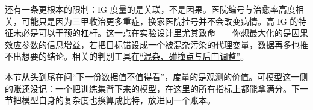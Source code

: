 还有一条更根本的限制：IG 度量的是关联，不是因果。医院编号与治愈率高度相关，可能只是因为三甲收治更多重症，换家医院挂号并不会改变病情。高 IG 的特征未必是可以干预的杠杆。这一点在实验设计里尤其致命——你想最大化的是因果效应参数的信息增益，若把目标错设成一个被混杂污染的代理变量，数据再多也推不出想要的结论。相关的判别工具在\hyperref[sec:13-Machine-Learning/12-Causal-Inference/03]{``混杂、碰撞点与后门调整''}。

本节从头到尾在问``下一份数据值不值得看''，度量的是观测的价值。可模型这一侧的账还没记：一个把训练集背下来的模型，在这里的所有指标上都能拿满分。下一节把模型自身的复杂度也换算成比特，放进同一个账本。
